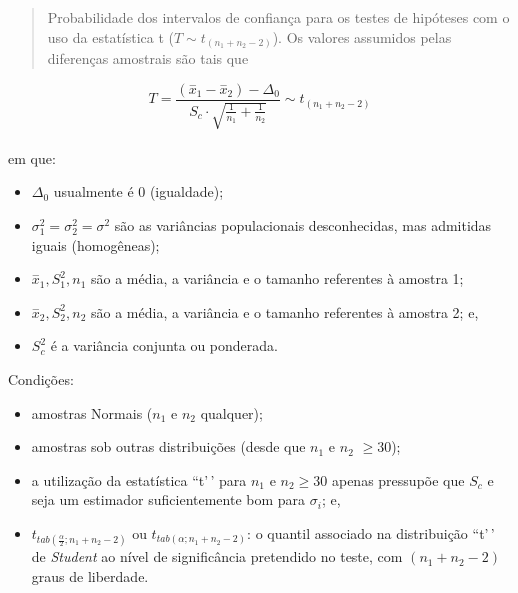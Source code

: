 \documentclass[
]{book}
\providecommand{\tightlist}{%
  \setlength{\itemsep}{0pt}\setlength{\parskip}{0pt}}
\begin{document}
\begin{quote}
Probabilidade dos intervalos de confiança para os testes de hipóteses com o uso da estatística t (\(T \sim t_{(n_{1} + n_{2} - 2)}\)). Os valores assumidos pelas diferenças amostrais são tais que
\end{quote}

\hfill\break

\[
T =  \frac{(\stackrel{-}{x}_{1} - \stackrel{-}{x}_{2})-\Delta_{0}}  {S_{c} \cdot \sqrt{\frac{1}{n_{1}}+\frac{1}{n_{2}}}}  \sim t_{(n_{1} + n_{2} - 2)}
\]\\

em que:

\hfill\break

\begin{itemize}
\tightlist
\item
  \(\Delta_{0}\) usualmente é 0 (igualdade);\\
\item
  \(\sigma_{1}^{2} = \sigma_{2}^{2} = \sigma^{2}\) são as variâncias populacionais desconhecidas, mas admitidas iguais (homogêneas);\\
\item
  \(\stackrel{-}{x}_{1}, S_{1}^{2}, n_{1}\) são a média, a variância e o tamanho referentes à amostra 1;\\
\item
  \(\stackrel{-}{x}_{2}, S_{2}^{2}, n_{2}\) são a média, a variância e o tamanho referentes à amostra 2; e,\\
\item
  \(S_{c}^{2}\) é a variância conjunta ou ponderada.
\end{itemize}

\hfill\break

Condições:

\hfill\break

\begin{itemize}
\tightlist
\item
  amostras Normais (\(n_{1}\) e \(n_{2}\) qualquer);\\
\item
  amostras sob outras distribuições (desde que \(n_{1}\) e \(n_{2}\) \(\ge 30\));\\
\item
  a utilização da estatística ``t'\,' para \(n_{1}\) e \(n_{2} \ge 30\) apenas pressupõe que \(S_{c}\) e seja um estimador suficientemente bom para \(\sigma_{i}\); e,
\item
  \({t}_{tab\left(\frac{\alpha }{2};{n}_{1}+{n}_{2}-2\right)}\) ou \({t}_{tab\left(\alpha ;{n}_{1}+{n}_{2}-2\right)}\): o quantil associado na distribuição ``t'\,' de \emph{Student} ao nível de significância pretendido no teste, com \(({n}_{1}+{n}_{2}-2)\) graus de liberdade.
\end{itemize}
\end{document}
